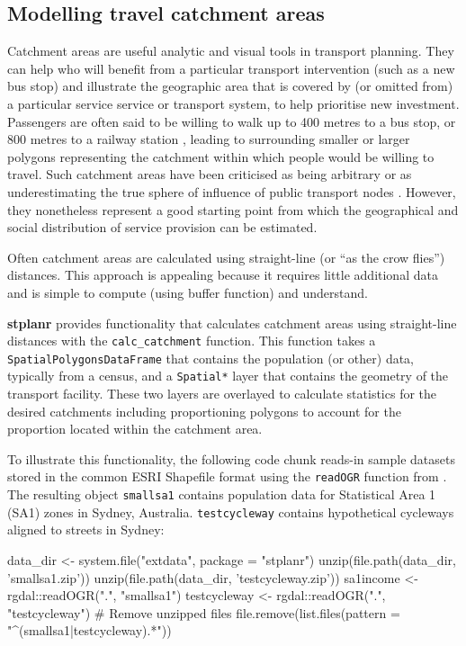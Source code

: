 \subsection{Modelling travel catchment
areas}\label{modelling-travel-catchment-areas}

Catchment areas are useful analytic and visual tools in transport planning.
They can help who will benefit from a particular
transport intervention (such as a new bus stop) and
illustrate the geographic area that is covered by (or omitted from) a particular service
service or transport system, to help prioritise new investment.
Passengers are often said to be willing to walk
up to 400 metres to a bus stop, or 800 metres to a railway station
\citep{el-geneidy_new_2014}, leading to surrounding smaller or larger polygons representing the catchment within which people would be willing to travel.
Such catchment areas have been criticised as being arbitrary or as underestimating the true
sphere of influence of public transport nodes
\citep{el-geneidy_new_2014,daniels_explaining_2013}.
However, they nonetheless
represent a good starting point from
which the geographical and social distribution of service provision can be estimated.

Often catchment areas are calculated using
straight-line (or ``as the crow flies'') distances. This
approach is appealing because it requires little
additional data and is simple to compute (using buffer function) and understand.

\textbf{stplanr} provides functionality that calculates catchment areas using
straight-line distances with the \texttt{calc\_catchment} function. This
function takes a \texttt{SpatialPolygonsDataFrame} that contains the
population (or other) data, typically from a census, and a
\texttt{Spatial*} layer that contains the geometry of the transport
facility. These two layers are overlayed to calculate statistics for the
desired catchments including proportioning polygons to account for the
proportion located within the catchment area.

To illustrate this functionality, the following code chunk
reads-in sample datasets stored in the common ESRI Shapefile format
using the \texttt{readOGR} function from .
The resulting object \texttt{smallsa1} contains population data for Statistical Area 1
(SA1) zones in Sydney, Australia.
\texttt{testcycleway} contains hypothetical
cycleways aligned to streets in Sydney:

\begin{Schunk}
\begin{Sinput}
data_dir <- system.file("extdata", package = "stplanr")
unzip(file.path(data_dir, 'smallsa1.zip'))
unzip(file.path(data_dir, 'testcycleway.zip'))
sa1income <- rgdal::readOGR(".", "smallsa1")
testcycleway <- rgdal::readOGR(".", "testcycleway")
# Remove unzipped files
file.remove(list.files(pattern = "^(smallsa1|testcycleway).*"))
\end{Sinput}
\end{Schunk}

